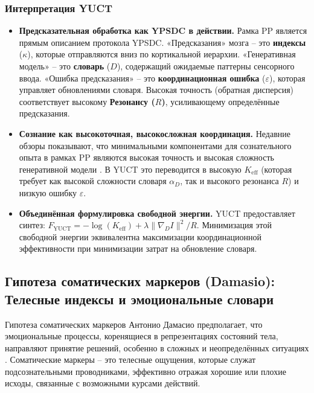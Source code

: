 \documentclass[12pt,a4paper]{article}
\begin{document}
	\subsubsection*{Интерпретация YUCT}
	\begin{itemize}
		\item \textbf{Предсказательная обработка как YPSDC в действии.} Рамка PP является прямым описанием протокола YPSDC. «Предсказания» мозга – это \textbf{индексы} (\(\kappa\)), которые отправляются вниз по кортикальной иерархии. «Генеративная модель» – это \textbf{словарь} (\(D\)), содержащий ожидаемые паттерны сенсорного ввода. «Ошибка предсказания» – это \textbf{координационная ошибка} (\(\varepsilon\)), которая управляет обновлениями словаря. Высокая точность (обратная дисперсия) соответствует высокому \textbf{Резонансу (\(R\))}, усиливающему определённые предсказания.
		\item \textbf{Сознание как высокоточная, высокосложная координация.} Недавние обзоры показывают, что минимальными компонентами для сознательного опыта в рамках PP являются высокая точность и высокая сложность генеративной модели \cite{Wiese2017}. В YUCT это переводится в высокую \(K_{\mathrm{eff}}\) (которая требует как высокой сложности словаря \(\alpha_D\), так и высокого резонанса \(R\)) и низкую ошибку \(\varepsilon\).
		\item \textbf{Объединённая формулировка свободной энергии.} YUCT предоставляет синтез: \(F_{\mathrm{YUCT}} = -\log(K_{\mathrm{eff}}) + \lambda \|\nabla_D I\|^2 / R\). Минимизация этой свободной энергии эквивалентна максимизации координационной эффективности при минимизации затрат на обновление словаря.
	\end{itemize}
	
	\subsection{Гипотеза соматических маркеров (Damasio): Телесные индексы и эмоциональные словари}
	
	Гипотеза соматических маркеров Антонио Дамасио предполагает, что эмоциональные процессы, коренящиеся в репрезентациях состояний тела, направляют принятие решений, особенно в сложных и неопределённых ситуациях \cite{Damasio1994}. Соматические маркеры – это телесные ощущения, которые служат подсознательными проводниками, эффективно отражая хорошие или плохие исходы, связанные с возможными курсами действий.
	
\end{document}
